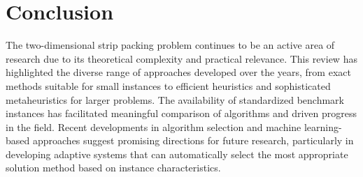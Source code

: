 \documentclass[11pt,a4paper]{article}
\begin{document}
\section{Conclusion}

The two-dimensional strip packing problem continues to be an active area of research due to its theoretical complexity and practical relevance. This review has highlighted the diverse range of approaches developed over the years, from exact methods suitable for small instances to efficient heuristics and sophisticated metaheuristics for larger problems. The availability of standardized benchmark instances has facilitated meaningful comparison of algorithms and driven progress in the field. Recent developments in algorithm selection and machine learning-based approaches suggest promising directions for future research, particularly in developing adaptive systems that can automatically select the most appropriate solution method based on instance characteristics.
\end{document}
